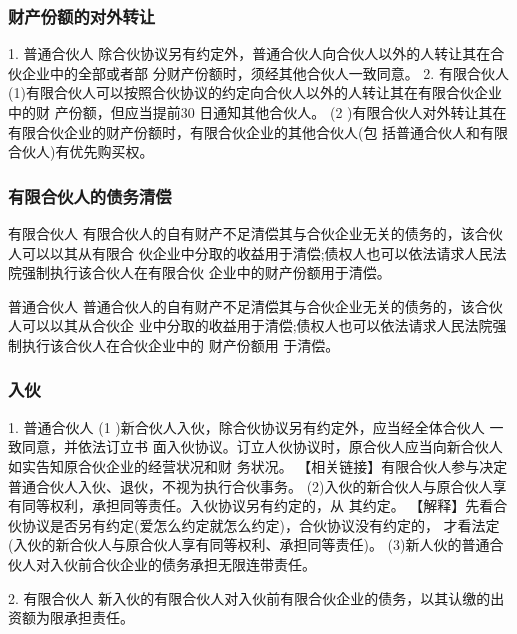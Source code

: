 \documentclass[UTF8,12pt]{ctexart}
\numberwithin{equation}{section} %
\numberwithin{figure}{section}
\numberwithin{table}{section}
\begin{document}
	\subsubsection{财产份额的对外转让}
	1. 普通合伙人 除合伙协议另有约定外，普通合伙人向合伙人以外的人转让其在合伙企业中的全部或者部 分财产份额时，须经其他合伙人一致同意。
	2. 有限合伙人 (1)有限合伙人可以按照合伙协议的约定向合伙人以外的人转让其在有限合伙企业中的财 产份额，但应当提前30 日通知其他合伙人。
	(2 )有限合伙人对外转让其在有限合伙企业的财产份额时，有限合伙企业的其他合伙人(包 括普通合伙人和有限合伙人)有优先购买权。
	
	
	\subsubsection{有限合伙人的债务清偿}
	
	
	有限合伙人 有限合伙人的自有财产不足清偿其与合伙企业无关的债务的，该合伙人可以以其从有限合 伙企业中分取的收益用于清偿;债权人也可以依法请求人民法院强制执行该合伙人在有限合伙 企业中的财产份额用于清偿。
	
	普通合伙人 普通合伙人的自有财产不足清偿其与合伙企业无关的债务的，该合伙人可以以其从合伙企 业中分取的收益用于清偿;债权人也可以依法请求人民法院强制执行该合伙人在合伙企业中的 财产份额用 于清偿。
	
	
	\subsubsection{入伙}
	1. 普通合伙人
	(1 )新合伙人入伙，除合伙协议另有约定外，应当经全体合伙人 一致同意，并依法订立书 面入伙协议。订立人伙协议时，原合伙人应当向新合伙人如实告知原合伙企业的经营状况和财 务状况。 【相关链接】有限合伙人参与决定普通合伙人入伙、退伙，不视为执行合伙事务。
	(2)入伙的新合伙人与原合伙人享有同等权利，承担同等责任。入伙协议另有约定的，从 其约定。
	【解释】先看合伙协议是否另有约定(爱怎么约定就怎么约定)，合伙协议没有约定的， 才看法定(入伙的新合伙人与原合伙人享有同等权利、承担同等责任)。
	(3)新人伙的普通合伙人对入伙前合伙企业的债务承担无限连带责任。
	
	
	2. 有限合伙人 新入伙的有限合伙人对入伙前有限合伙企业的债务，以其认缴的出资额为限承担责任。
	
\end{document}
